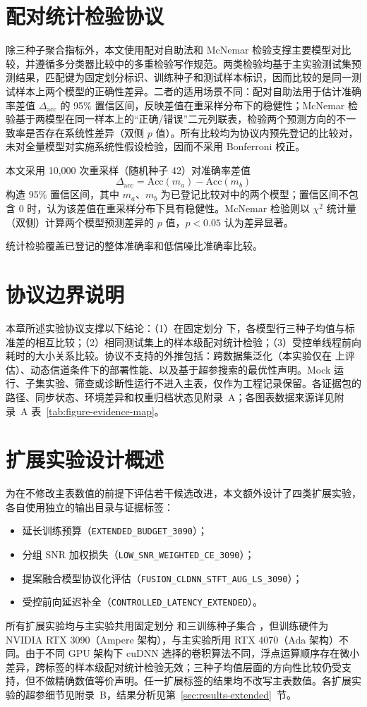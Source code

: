 \section{配对统计检验协议}

除三种子聚合指标外，本文使用配对自助法和 McNemar 检验支撑主要模型对比较\cite{efron1979bootstrap,mcnemar1947note}，并遵循多分类器比较中的多重检验写作规范\cite{demsar2006statistical}。两类检验均基于主实验测试集预测结果，匹配键为固定划分标识、训练种子和测试样本标识，因而比较的是同一测试样本上两个模型的正确性差异。二者的适用场景不同：配对自助法用于估计准确率差值 \(\Delta_{\mathrm{acc}}\) 的 95\% 置信区间，反映差值在重采样分布下的稳健性；McNemar 检验基于两模型在同一样本上的“正确/错误”二元列联表，检验两个预测方向的不一致率是否存在系统性差异（双侧 \(p\) 值）。所有比较均为协议内预先登记的比较对，未对全量模型对实施系统性假设检验，因而不采用 Bonferroni 校正。

本文采用 10{,}000 次重采样（随机种子 42）对准确率差值
\begin{equation}
  \Delta_{\mathrm{acc}}=\mathrm{Acc}(m_a)-\mathrm{Acc}(m_b)
  \label{eq:paired-bootstrap-delta}
\end{equation}
构造 95\% 置信区间，其中 \(m_a\)、\(m_b\) 为已登记比较对中的两个模型；置信区间不包含 0 时，认为该差值在重采样分布下具有稳健性。McNemar 检验则以 \(\chi^2\) 统计量（双侧）计算两个模型预测差异的 \(p\) 值，\(p<0.05\) 认为差异显著。

统计检验覆盖已登记的整体准确率和低信噪比准确率比较。

\section{协议边界说明}

本章所述实验协议支撑以下结论：（1）在固定划分 \splitname{} 下，各模型行三种子均值与标准差的相互比较；（2）相同测试集上的样本级配对统计检验；（3）受控单线程前向耗时的大小关系比较。协议不支持的外推包括：跨数据集泛化（本实验仅在 \datasetname{} 上评估）、动态信道条件下的部署性能、以及基于超参搜索的最优性声明。Mock 运行、子集实验、筛查或诊断性运行不进入主表，仅作为工程记录保留。各证据包的路径、同步状态、环境差异和权重归档状态见附录~A；各图表数据来源详见附录~A 表~\ref{tab:figure-evidence-map}。

\section{扩展实验设计概述}

为在不修改主表数值的前提下评估若干候选改进，本文额外设计了四类扩展实验，各自使用独立的输出目录与证据标签：
\begin{itemize}
  \item 延长训练预算（\texttt{EXTENDED\_BUDGET\_3090}）；
  \item 分组 SNR 加权损失（\texttt{LOW\_SNR\_WEIGHTED\_CE\_3090}）；
  \item 提案融合模型协议化评估（\texttt{FUSION\_CLDNN\_STFT\_AUG\_LS\_3090}）；
  \item 受控前向延迟补全（\texttt{CONTROLLED\_LATENCY\_EXTENDED}）。
\end{itemize}

所有扩展实验均与主实验共用固定划分 \splitname{} 和三训练种子集合 \mainseeds{}，但训练硬件为 NVIDIA RTX 3090（Ampere 架构），与主实验所用 RTX 4070（Ada 架构）不同。由于不同 GPU 架构下 cuDNN 选择的卷积算法不同，浮点运算顺序存在微小差异，跨标签的样本级配对统计检验无效；三种子均值层面的方向性比较仍受支持，但不做精确数值等价声明。任一扩展标签的结果均不改写主表数值。各扩展实验的超参细节见附录~B，结果分析见第~\ref{sec:results-extended}~节。
